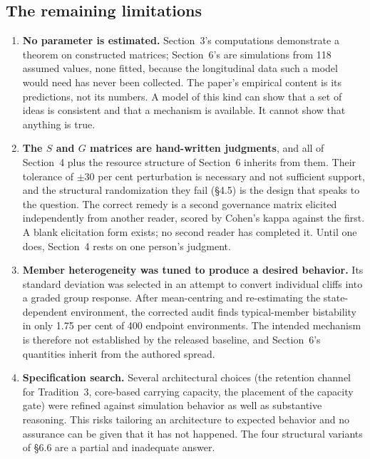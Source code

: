 \documentclass[11pt,a4paper]{article}
\begin{document}
\subsection{The remaining limitations}

\begin{enumerate}
\item \textbf{No parameter is estimated.} Section~3's computations demonstrate a
theorem on constructed matrices; Section~6's are simulations from 118 assumed
values, none fitted, because the longitudinal data such a model would need has
never been collected. The paper's empirical content is its predictions, not its
numbers. A model of this kind can show that a set of ideas is consistent and that
a mechanism is available. It cannot show that anything is true.

\item \textbf{The $S$ and $G$ matrices are hand-written judgments}, and all of
Section~4 plus the resource structure of Section~6 inherits from them. Their
tolerance of $\pm30$ per cent perturbation is necessary and not sufficient
support, and the structural randomization they fail (\S4.5) is the design that
speaks to the question. The correct remedy is a second governance matrix elicited
independently from another reader, scored by Cohen's kappa against the first. A
blank elicitation form exists; no second reader has completed it. Until one does,
Section~4 rests on one person's judgment.

\item \textbf{Member heterogeneity was tuned to produce a desired behavior.} Its
standard deviation was selected in an attempt to convert individual cliffs into a
graded group response. After mean-centring and re-estimating the state-dependent
environment, the corrected audit finds typical-member bistability in only 1.75 per
cent of 400 endpoint environments. The intended mechanism is therefore not established
by the released baseline, and Section~6's quantities inherit from the authored spread.

\item \textbf{Specification search.} Several architectural choices (the retention
channel for Tradition~3, core-based carrying capacity, the placement of the
capacity gate) were refined against simulation behavior as well as substantive
reasoning. This risks tailoring an architecture to expected behavior and no
assurance can be given that it has not happened. The four structural variants of
\S6.6 are a partial and inadequate answer.


\end{enumerate}
\end{document}
